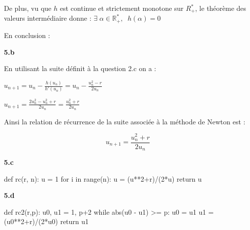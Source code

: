 \documentclass[11pt]{article}
\newcommand{\bfrac}[2]{\displaystyle\frac{#1}{#2}}
\newcommand{\R}{\mathbb{R}}
\begin{document}
\noindent De plus, vu que $h$ est continue et strictement monotone sur $R^*_+$, le théorème des valeurs intermédiaire donne : $\exists \; \alpha \in \R^*_+, \;\; h(\alpha) = 0$

\begin{center}
\end{center}

\noindent En conclusion :

\vspace{15px}
\textbf{5.b}

\noindent En utilisant la suite définit à la question 2.c on a :

$u_{n+1} = u_n - \bfrac{h(u_n)}{h'(u_n)} = u_n - \bfrac{u_n^2 - r}{2u_n}$

$u_{n+1} = \bfrac{2u_n^2 - u_n^2 + r}{2u_n}  = \bfrac{u_n^2 + r}{2u_n}$

\vspace{5px}

\noindent Ainsi la relation de récurrence de la suite associée à la méthode de Newton est :

\vspace{5px}
\[\boxed{u_{n+1} = \bfrac{u_n^2 + r}{2u_n}}\]

\vspace{12px}
\textbf{5.c}
\begin{python}
def rc(r, n):
  u = 1
  for i in range(n):
    u = (u**2+r)/(2*u)
  return u
\end{python}

\vspace{10px}
\textbf{5.d}
\begin{python}
def rc2(r,p):
  u0, u1 = 1, p+2
  while abs(u0 - u1) >= p:
    u0 = u1
    u1 = (u0**2+r)/(2*u0)
  return u1
\end{python}
\end{document}
